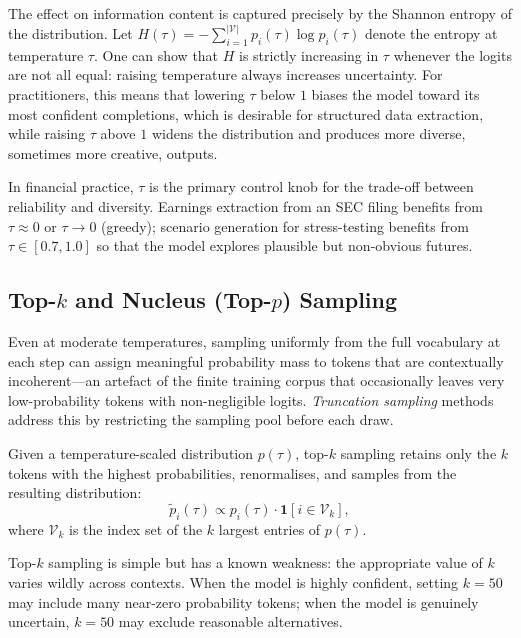 \begin{deepdive}
The effect on information content is captured precisely by the Shannon entropy of
the distribution.  Let $H(\tau) = -\sum_{i=1}^{|\mathcal{V}|} p_i(\tau) \log
p_i(\tau)$ denote the entropy at temperature $\tau$.  One can show that $H$ is
strictly increasing in $\tau$ whenever the logits are not all equal: raising
temperature always increases uncertainty.  For practitioners, this means that
lowering $\tau$ below $1$ biases the model toward its most confident completions,
which is desirable for structured data extraction, while raising $\tau$ above $1$
widens the distribution and produces more diverse, sometimes more creative, outputs.

In financial practice, $\tau$ is the primary control knob for the trade-off between
reliability and diversity.  Earnings extraction from an SEC filing benefits from
$\tau \approx 0$ or $\tau \to 0$ (greedy); scenario generation for stress-testing
benefits from $\tau \in [0.7, 1.0]$ so that the model explores plausible but
non-obvious futures.

\subsection{Top-$k$ and Nucleus (Top-$p$) Sampling}
\label{sec:sampling-topk-topp}

Even at moderate temperatures, sampling uniformly from the full vocabulary at each
step can assign meaningful probability mass to tokens that are contextually
incoherent---an artefact of the finite training corpus that occasionally leaves
very low-probability tokens with non-negligible logits.  \emph{Truncation sampling}
methods address this by restricting the sampling pool before each draw.

\begin{definition}
\label{def:topk}
Given a temperature-scaled distribution $p(\tau)$, top-$k$ sampling retains only
the $k$ tokens with the highest probabilities, renormalises, and samples from the
resulting distribution:
\begin{equation}
  \tilde{p}_i(\tau) \propto p_i(\tau) \cdot \mathbf{1}[i \in \mathcal{V}_k],
  \label{eq:topk}
\end{equation}
where $\mathcal{V}_k$ is the index set of the $k$ largest entries of $p(\tau)$.
\end{definition}

Top-$k$ sampling is simple but has a known weakness: the appropriate value of $k$
varies wildly across contexts.  When the model is highly confident, setting $k=50$
may include many near-zero probability tokens; when the model is genuinely uncertain,
$k=50$ may exclude reasonable alternatives.


\end{deepdive}
